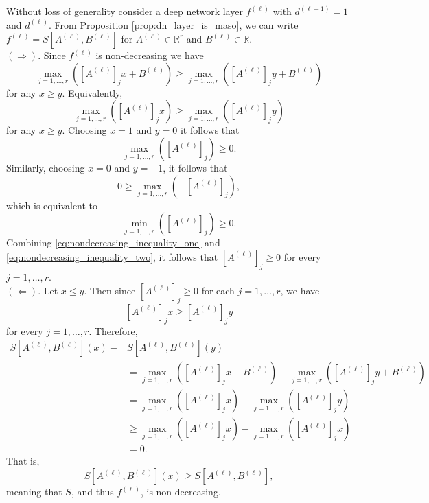 \begin{tproof}
    Without loss of generality consider a deep network layer $f^{(\ell)}$ with $d^{(\ell-1)}=1$ and $d^{(\ell)}$. From Proposition \ref{prop:dn_layer_is_maso}, we can write $f^{(\ell)}=S\left[A^{(\ell)},B^{(\ell)}\right]$ for $A^{(\ell)}\in\mathbb{R}^r$ and $B^{(\ell)}\in\mathbb{R}$.\\$(\Rightarrow)$. Since $f^{(\ell)}$ is non-decreasing we have $$\max_{j=1,\dots,r}\left(\left[A^{(\ell)}\right]_jx+B^{(\ell)}\right)\geq\max_{j=1,\dots,r}\left(\left[A^{(\ell)}\right]_jy+B^{(\ell)}\right)$$for any $x\geq y$. Equivalently, $$\max_{j=1,\dots,r}\left(\left[A^{(\ell)}\right]_jx\right)\geq\max_{j=1,\dots,r}\left(\left[A^{(\ell)}\right]_jy\right)$$for any $x\geq y$. Choosing $x=1$ and $y=0$ it follows that 
    \begin{equation}\label{eq:nondecreasing_inequality_one}
        \max_{j=1,\dots,r}\left(\left[A^{(\ell)}\right]_j\right)\geq0.
    \end{equation}
    Similarly, choosing $x=0$ and $y=-1$, it follows that $$0\geq\max_{j=1,\dots,r}\left(-\left[A^{(\ell)}\right]_j\right),$$which is equivalent to 
    \begin{equation}\label{eq:nondecreasing_inequality_two}
        \min_{j=1,\dots,r}\left(\left[A^{(\ell)}\right]_j\right)\geq0.
    \end{equation}
    Combining \eqref{eq:nondecreasing_inequality_one} and \eqref{eq:nondecreasing_inequality_two}, it follows that $\left[A^{(\ell)}\right]_j\geq0$ for every $j=1,\dots,r$.\\$(\Leftarrow)$. Let $x\leq y$. Then since $\left[A^{(\ell)}\right]_j\geq0$ for each $j=1,\dots,r$, we have $$\left[A^{(\ell)}\right]_jx\geq\left[A^{(\ell)}\right]_jy$$for every $j=1,\dots,r$. Therefore,
    \begin{align*}
        S\left[A^{(\ell)},B^{(\ell)}\right](x)-&S\left[A^{(\ell)},B^{(\ell)}\right](y)\\&=\max_{j=1,\dots,r}\left(\left[A^{(\ell)}\right]_jx+B^{(\ell)}\right)-\max_{j=1,\dots,r}\left(\left[A^{(\ell)}\right]_jy+B^{(\ell)}\right)\\&=\max_{j=1,\dots,r}\left(\left[A^{(\ell)}\right]_jx\right)-\max_{j=1,\dots,r}\left(\left[A^{(\ell)}\right]_jy\right)\\&\geq\max_{j=1,\dots,r}\left(\left[A^{(\ell)}\right]_jx\right)-\max_{j=1,\dots,r}\left(\left[A^{(\ell)}\right]_jx\right)\\&=0.
    \end{align*}
    That is, $$S\left[A^{(\ell)},B^{(\ell)}\right](x)\geq S\left[A^{(\ell)},B^{(\ell)}\right],$$meaning that $S$, and thus $f^{(\ell)}$, is non-decreasing.
\end{tproof}

